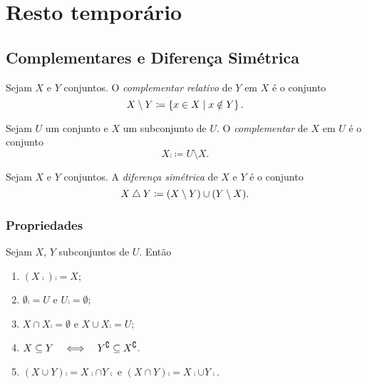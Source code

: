 \chapter{Resto temporário}

\section{Complementares e Diferença Simétrica}

\begin{defi}
Sejam $X$ e $Y$ conjuntos. O \emph{complementar relativo} de $Y$ em $X$ é o conjunto
	\begin{equation*}
	X \setminus Y \coloneqq \set{x \in X}{x \notin Y}.
	\end{equation*}
\end{defi}

\begin{defi}
Sejam $U$ um conjunto e $X$ um subconjunto de $U$. O \emph{complementar} de $X$ em $U$ é o conjunto
	\begin{equation*}
	X\comp \coloneqq U \setminus X.
	\end{equation*}
\end{defi}

\begin{defi}
Sejam $X$ e $Y$ conjuntos. A \emph{diferença simétrica} de $X$ e $Y$ é o conjunto
	\begin{equation*}
	X \difsim Y \coloneqq (X \setminus Y) \cup (Y \setminus X).
	\end{equation*}
\end{defi}

\subsection{Propriedades}

\begin{prop}
Sejam $X$, $Y$ subconjuntos de $U$. Então
	\begin{enumerate}
	\item $(X\comp)\comp = X$;
	\item $\emptyset\comp = U$ e $U\comp = \emptyset$;
	\item $X \cap X\comp = \emptyset$ e $X \cup X\comp = U$;
	\item $X \subseteq Y \quad \Longleftrightarrow \quad Y^\complement \subseteq X^\complement$.
	\item $(X \cup Y)\comp = X\comp \cap Y\comp$ e $(X \cap Y)\comp = X\comp \cup Y\comp$.
	\end{enumerate}
\end{prop}




